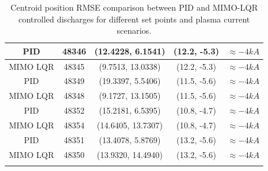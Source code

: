 \begin{center}
\begin{longtable}{||c| c| c| c|c||}
		\hline
		PID & 48346 & (12.4228,	6.1541)  & (12.2, -5.3)& $\approx -4 kA$\\ 
		\hline
		MIMO LQR & 48345 & (9.7513,	13.0338) & (12.2, -5.3)& $\approx -4 kA$ \\
		\hline
		PID & 48349 & (19.3397,	5.5406)  & (11.5, -5.6)&$\approx -4 kA$  \\ 
		\hline
		MIMO LQR & 48348 & (9.1727,	13.1505) & (11.5, -5.6)&$\approx -4 kA$  \\
		\hline
		PID & 48352 &  (15.2181,	6.5395) & (10.8, -4.7) &$\approx -4 kA$ \\ 
		\hline
		MIMO LQR & 48354 & (14.6405,	13.7307) & (10.8, -4.7)& $\approx -4 kA$ \\
		\hline
		PID & 48351 &  (13.4078, 5.8769) & (13.2, -5.6)& $\approx -4 kA$ \\ 
		\hline
		MIMO LQR & 48350 & (13.9320,	14.4940) & (13.2, -5.6)&$\approx -4 kA$  \\[1ex]
		\hline
		\caption{Centroid position RMSE comparison between PID and MIMO-LQR controlled discharges for different set points and plasma current scenarios.}
	\end{longtable}
\label{TableControl}

\end{center}


